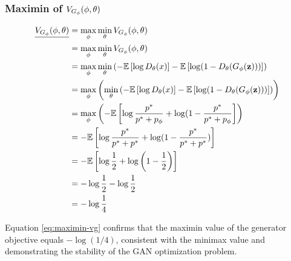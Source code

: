 \subsubsection{Maximin of $V_{G_\phi}(\phi, \theta)$}
\label{sec:maximin-vg}
\begin{align}
	\underline{V_{G_\phi}(\phi, \theta)} & = \max_{\mathbf{\phi}} \min_{\mathbf{\theta}}V_{G_\phi}(\phi, \theta) \nonumber \\
	                & = \max_{\mathbf{\phi}}\min_{\mathbf{\theta}}V_{G_\phi}(\phi, \theta) \nonumber  \\
	                & = \max_{\phi}\min_{\theta} \left(
	-\mathbb{E}\left[\log{D_\theta(x)}\right] -
	\mathbb{E}\left[\log(1 -
	D_\theta(G_\phi(\mathbf{z})))\right] \right) \nonumber                                 \\
	                & = \max_{\phi}\left(\min_{\theta} \left(
		-\mathbb{E}\left[\log{D_\theta(x)}\right] -
		\mathbb{E}\left[\log(1 -
				D_\theta(G_\phi(\mathbf{z})))\right] \right)
	\right) \nonumber                                                            \\
	                & = \max_{\phi}\left(
	-\mathbb{E}\left[\log{p^*\over p^*+ p_{\phi}} +
	\log(1 -
	{p^* \over p^* + p_{\phi}}\right] \right) \nonumber                               \\
	                & =
	-\mathbb{E}\left[\log{p^*\over p^*+ p^*} +
		\log(1 -
	{p^* \over p^* + p^*})\right] \nonumber                                      \\
	                & = - \mathbb{E}\left[\log{1 \over 2} +
	\log{\left(1 - {1 \over 2}\right)}\right] \nonumber                          \\
	                & = - \log{1 \over 2} - \log{1 \over 2} \nonumber            \\
	                & = - \log{1 \over 4} \label{eq:maximin-vg}
\end{align}

Equation \ref{eq:maximin-vg} confirms that the maximin value of the generator objective equals $-\log(1/4)$, consistent with the minimax value and demonstrating the stability of the GAN optimization problem.

